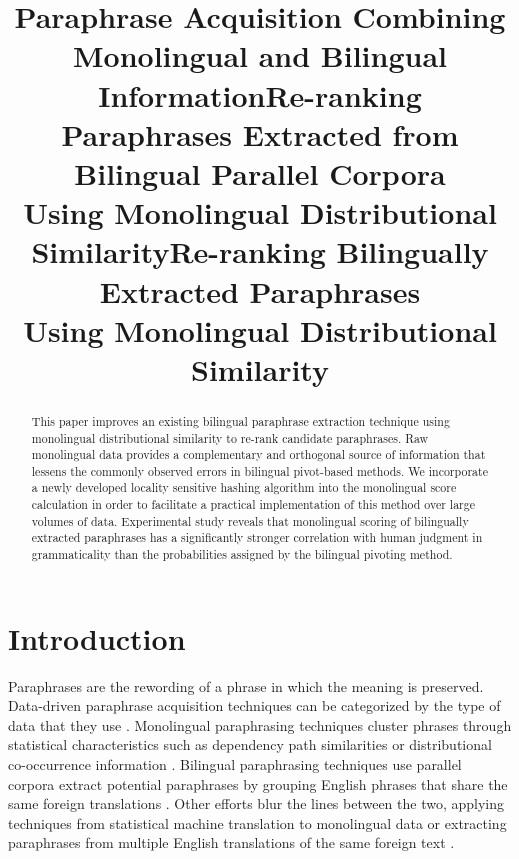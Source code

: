 \documentclass[11pt]{article}
\title{Paraphrase Acquisition Combining Monolingual and Bilingual Information}
\title{Re-ranking Paraphrases Extracted from Bilingual Parallel Corpora \\ Using Monolingual Distributional Similarity}
\title{Re-ranking Bilingually Extracted Paraphrases \\ Using Monolingual Distributional Similarity}
\date{}
\newcommand{\mnote}[1]{\marginpar{\raggedleft\footnotesize\itshape#1}}
\begin{document}
\maketitle
\begin{abstract}
This paper improves an existing bilingual paraphrase extraction technique using monolingual distributional similarity to re-rank candidate paraphrases.  Raw monolingual data  provides a complementary and orthogonal source of information that lessens the commonly observed errors in bilingual pivot-based methods. We incorporate a newly developed locality sensitive hashing algorithm into the monolingual score calculation in order to facilitate a practical implementation of this method over large volumes of data. Experimental study reveals that monolingual scoring of bilingually extracted paraphrases has a significantly stronger correlation with human judgment in grammaticality than the probabilities assigned by the bilingual pivoting method.


\end{abstract} 


\section{Introduction}
Paraphrases are the rewording of a phrase in which the meaning is preserved. Data-driven paraphrase acquisition techniques can be categorized by the type of data that they use \cite{MadnaniDorr10}.  Monolingual paraphrasing techniques cluster phrases through statistical characteristics such as dependency path similarities or distributional co-occurrence information \cite{Lin01discoveryof,PascaDienes05}.   Bilingual paraphrasing techniques use parallel corpora extract potential paraphrases by grouping English phrases that share the same foreign translations \cite{BannardCallisonBurch05}.  Other efforts blur the lines between the two, applying techniques from statistical machine translation to monolingual data or extracting paraphrases from multiple English translations of the same foreign text \cite{Barzilay2001,PangEtAl03,QuirkDolanBrockett04}.

\end{document}

